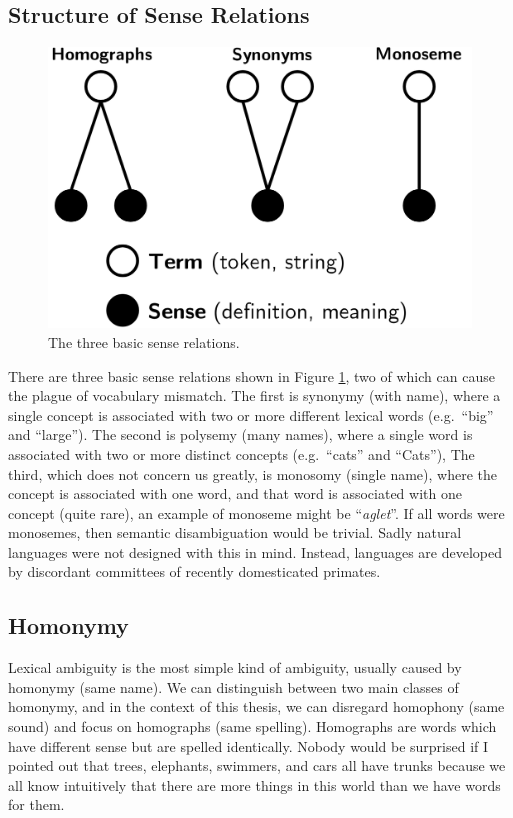 \subsection{Structure of Sense Relations}

\begin{figure}[b]
    \centering
    \includegraphics[scale=0.5]{graphics/sense-relations.png}
    \caption{The three basic sense relations.}
    \label{fig:sense-relations}
\end{figure}


There are three basic sense relations shown in Figure \ref{fig:sense-relations}, two of which can cause the plague of vocabulary mismatch. The first is synonymy (with name), where a single concept is associated with two or more different lexical words (e.g.\ ``big'' and ``large''). The second is polysemy (many names), where a single word is associated with two or more distinct concepts (e.g.\ ``cats'' and ``Cats''), The third, which does not concern us greatly, is monosomy (single name), where the concept is associated with one word, and that word is associated with one concept (quite rare), an example of monoseme might be ``\textit{aglet}''. If all words were monosemes, then semantic disambiguation would be trivial. Sadly natural languages were not designed with this in mind. Instead, languages are developed by discordant committees of recently domesticated primates.


\subsection{Homonymy}
Lexical ambiguity is the most simple kind of ambiguity, usually caused by homonymy (same name). We can distinguish between two main classes of homonymy, and in the context of this thesis, we can disregard homophony (same sound) and focus on homographs (same spelling). Homographs are words which have different sense but are spelled identically. Nobody would be surprised if I pointed out that trees, elephants, swimmers, and cars all have trunks because we all know intuitively that there are more things in this world than we have words for them.


